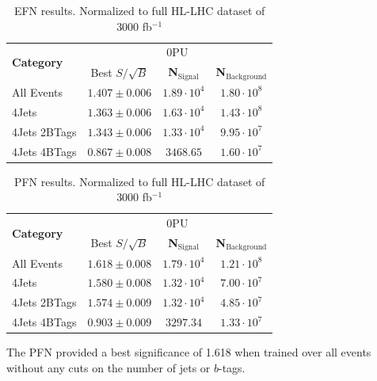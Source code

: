 \begin{table}[ht!]
\centering
    \begin{tabular}{|l|c|c|c|} %
      \hline\hline
      \multirow{2}{*}{\textbf{Category}} & \multicolumn{3}{c|}{0PU}\\
      \cline{2-4}
      & Best $S/\sqrt{B}$ & \textbf{N$_{\mathrm{Signal}}$} & \textbf{N$_{\mathrm{Background}}$} \\
      \hline
      All Events & $1.407 \pm 0.006$ & $1.89\cdot 10^4$ & $1.80\cdot 10^8$ \\
      4Jets & $1.363 \pm 0.006$ & $1.63\cdot 10^4$ & $1.43\cdot 10^8$ \\
      4Jets 2BTags & $1.343 \pm 0.006$ & $1.33\cdot 10^4$ & $9.95\cdot 10^7$ \\
      4Jets 4BTags & $0.867 \pm 0.008$ & $3468.65$ & $1.60\cdot 10^7$ \\
      \hline\hline
    \end{tabular}
    \caption{EFN results. Normalized to full HL-LHC dataset of 3000 fb$^{-1}$}
\label{EFNtab}
\end{table}

\begin{table}[ht!]
\centering
    \begin{tabular}{|l|c|c|c|} %
      \hline\hline
      \multirow{2}{*}{\textbf{Category}} & \multicolumn{3}{c|}{0PU}\\
      \cline{2-4}
      & Best $S/\sqrt{B}$ & \textbf{N$_{\mathrm{Signal}}$} & \textbf{N$_{\mathrm{Background}}$} \\
      \hline
      All Events & $1.618 \pm 0.008$ & $1.79\cdot 10^4$ & $1.21\cdot 10^8$ \\
      4Jets & $1.580 \pm 0.008$ & $1.32\cdot 10^4$ & $7.00\cdot 10^7$ \\
      4Jets 2BTags & $1.574 \pm 0.009$ & $1.32\cdot 10^4$ & $4.85\cdot 10^7$ \\
      4Jets 4BTags & $0.903 \pm 0.009$ & $3297.34$ & $1.33\cdot 10^7$ \\
      \hline\hline
    \end{tabular}
    \caption{PFN results. Normalized to full HL-LHC dataset of 3000 fb$^{-1}$}
\label{PFNtab}
\end{table}

The PFN provided a best significance of 1.618 when trained over all events without any cuts on the number of jets or $b$-tags.
